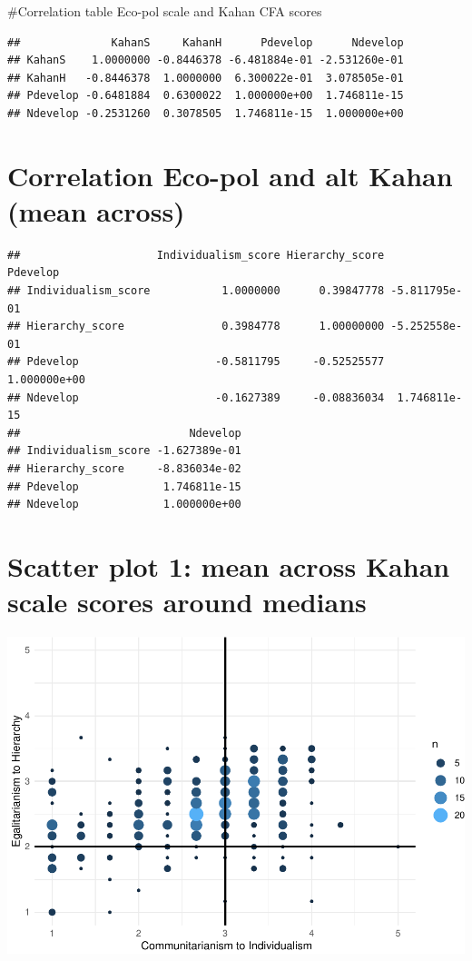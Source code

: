 \documentclass[
]{article}
\begin{document}
\newpage

\#Correlation table Eco-pol scale and Kahan CFA scores

\begin{verbatim}
##              KahanS     KahanH      Pdevelop      Ndevelop
## KahanS    1.0000000 -0.8446378 -6.481884e-01 -2.531260e-01
## KahanH   -0.8446378  1.0000000  6.300022e-01  3.078505e-01
## Pdevelop -0.6481884  0.6300022  1.000000e+00  1.746811e-15
## Ndevelop -0.2531260  0.3078505  1.746811e-15  1.000000e+00
\end{verbatim}

\hypertarget{correlation-eco-pol-and-alt-kahan-mean-across}{%
\section{Correlation Eco-pol and alt Kahan (mean
across)}\label{correlation-eco-pol-and-alt-kahan-mean-across}}

\begin{verbatim}
##                     Individualism_score Hierarchy_score      Pdevelop
## Individualism_score           1.0000000      0.39847778 -5.811795e-01
## Hierarchy_score               0.3984778      1.00000000 -5.252558e-01
## Pdevelop                     -0.5811795     -0.52525577  1.000000e+00
## Ndevelop                     -0.1627389     -0.08836034  1.746811e-15
##                          Ndevelop
## Individualism_score -1.627389e-01
## Hierarchy_score     -8.836034e-02
## Pdevelop             1.746811e-15
## Ndevelop             1.000000e+00
\end{verbatim}

\newpage

\hypertarget{scatter-plot-1-mean-across-kahan-scale-scores-around-medians}{%
\section{Scatter plot 1: mean across Kahan scale scores around
medians}\label{scatter-plot-1-mean-across-kahan-scale-scores-around-medians}}

\includegraphics{corstuff_files/figure-latex/unnamed-chunk-27-1.pdf}
\end{document}
